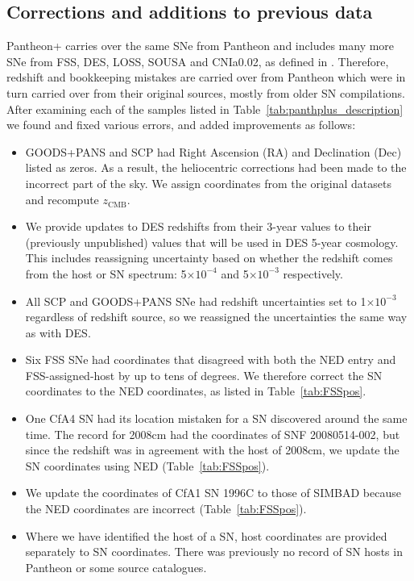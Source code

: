 \documentclass[
  journal=pasa,
  manuscript=research-paper,
  year=2022,
]{cup-journal}
\newcommand{\zCMB}[1]{\ensuremath{z_{\text{CMB}}^{\mathrm{#1}}}}
\newcommand{\tten}[1]{\ensuremath{\times 10^{#1}}}
\begin{document}
\subsection{Corrections and additions to previous data}\label{subsec:corrections}
Pantheon+ carries over the same SNe from Pantheon and includes many more SNe from FSS, DES, LOSS, SOUSA and CNIa0.02, as defined in \citet{Scolnic2022samples}.
Therefore, redshift and bookkeeping mistakes are carried over from Pantheon which were in turn carried over from their original sources, mostly from older SN compilations.
After examining each of the samples listed in Table~\ref{tab:panthplus_description} we found and fixed various errors, and added improvements as follows: 
\begin{itemize}
    \item GOODS+PANS and SCP had Right Ascension (RA) and Declination (Dec) listed as zeros.  As a result, the heliocentric corrections had been made to the incorrect part of the sky.  We assign coordinates from the original datasets \citep{Riess2004, Riess2007, Suzuki2012} and recompute \zCMB{}.
    \item We provide updates to DES redshifts from their 3-year values \citep{Smith2020} to their (previously unpublished) values that will be used in DES 5-year cosmology. This includes reassigning uncertainty based on whether the redshift comes from the host or SN spectrum:  5\tten{-4} and 5\tten{-3} respectively. 
    \item All SCP and GOODS+PANS SNe had redshift uncertainties set to 1\tten{-3} regardless of redshift source, so we reassigned the uncertainties the same way as with DES.
    \item Six FSS SNe had coordinates that disagreed with both the NED entry and FSS-assigned-host by up to tens of degrees.  
    We therefore correct the SN coordinates to the NED coordinates, as listed in Table~\ref{tab:FSSpos}.
    \item One CfA4 SN had its location mistaken for a SN discovered around the same time. The record for 2008cm had the coordinates of SNF 20080514-002, but since the redshift was in agreement with the host of 2008cm, we update the SN coordinates using NED (Table~\ref{tab:FSSpos}). 
    \item We update the coordinates of CfA1 SN 1996C to those of SIMBAD because the NED coordinates are incorrect (Table~\ref{tab:FSSpos}).
    \item Where we have identified the host of a SN, host coordinates are provided separately to SN coordinates. There was previously no record of SN hosts in Pantheon or some source catalogues.

\end{itemize}
\end{document}
